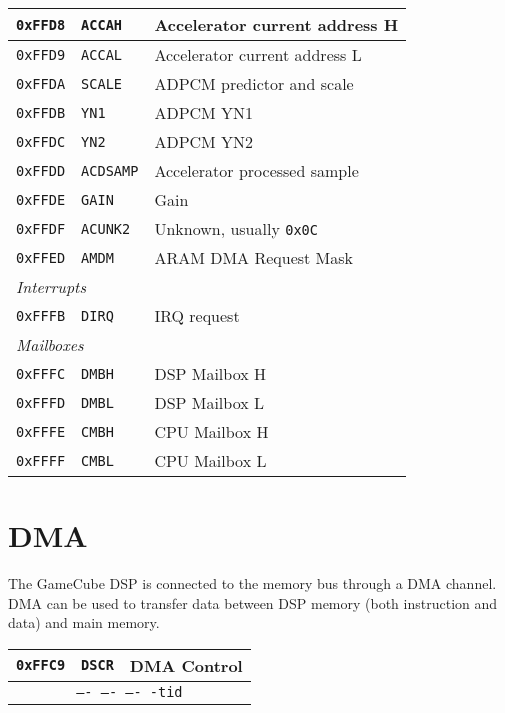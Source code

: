 \documentclass[oneside,english,a4paper,10pt,oneside,openany,final]{memoir}
\newcommand{\Address}[1]{\texttt{#1}}
\newcommand{\Register}[1]{\texttt{#1}}
\newcommand{\Value}[1]{\texttt{#1}}
\newcommand{\RegisterBitOverview}[4]{
  \begin{table}[H]
  \centering
  \begin{tabular}{|lcr|}
  \hline
  \Address{#1} & \Register{#2} & {#3} \\ \hline
  \multicolumn{3}{|c|}{\texttt{#4}}   \\ \hline
  \end{tabular}
  \end{table}
}
\begin{document}
\begin{table}[htb]
\begin{tabular}{|l|l|l|}
\Address{0xFFD8} & \Register{ACCAH}   & Accelerator current address H \\ \hline
\Address{0xFFD9} & \Register{ACCAL}   & Accelerator current address L \\ \hline
\Address{0xFFDA} & \Register{SCALE}   & ADPCM predictor and scale     \\ \hline
\Address{0xFFDB} & \Register{YN1}     & ADPCM YN1                     \\ \hline
\Address{0xFFDC} & \Register{YN2}     & ADPCM YN2                     \\ \hline
\Address{0xFFDD} & \Register{ACDSAMP} & Accelerator processed sample  \\ \hline
\Address{0xFFDE} & \Register{GAIN}    & Gain                          \\ \hline
\Address{0xFFDF} & \Register{ACUNK2}  & Unknown, usually \Value{0x0C} \\ \hline
\Address{0xFFED} & \Register{AMDM}    & ARAM DMA Request Mask         \\ \hline
\multicolumn{3}{|l|}{\textit{Interrupts}}                             \\ \hline
\Address{0xFFFB} & \Register{DIRQ}    & IRQ request                   \\ \hline
\multicolumn{3}{|l|}{\textit{Mailboxes}}                              \\ \hline
\Address{0xFFFC} & \Register{DMBH}    & DSP Mailbox H                 \\ \hline
\Address{0xFFFD} & \Register{DMBL}    & DSP Mailbox L                 \\ \hline
\Address{0xFFFE} & \Register{CMBH}    & CPU Mailbox H                 \\ \hline
\Address{0xFFFF} & \Register{CMBL}    & CPU Mailbox L                 \\ \hline
\end{tabular}
\end{table}

\pagebreak{}

\section{DMA}

The GameCube DSP is connected to the memory bus through a DMA channel. DMA can be used to transfer data between DSP memory (both instruction and data) and main memory.

\RegisterBitOverview{0xFFC9}{DSCR}{DMA Control}{---- ---- ---- -tid}
\end{document}
